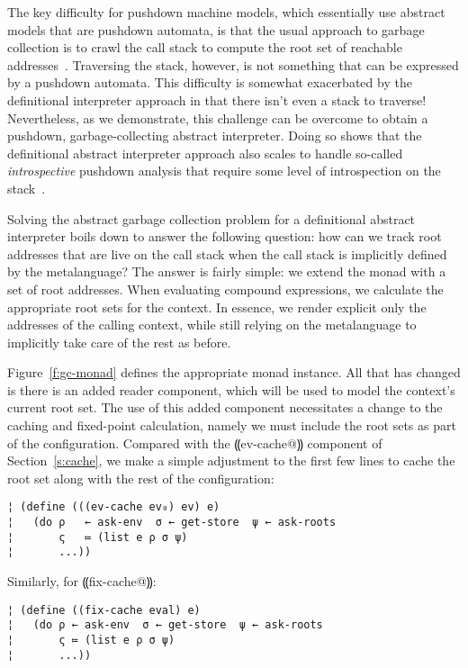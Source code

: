 The key difficulty for pushdown machine models, which essentially use
abstract models that are pushdown automata, is that the usual approach
to garbage collection is to crawl the call stack to compute the root
set of reachable addresses~\cite{dvanhorn:Morrisett1995Abstract}.
Traversing the stack, however, is not something that can be expressed
by a pushdown automata.
%
This difficulty is somewhat exacerbated by the definitional
interpreter approach in that there isn't even a stack to traverse!
Nevertheless, as we demonstrate, this challenge can be overcome to
obtain a pushdown, garbage-collecting abstract interpreter.
%
Doing so shows that the definitional abstract interpreter approach
also scales to handle so-called \emph{introspective} pushdown analysis
that require some level of introspection on the
stack~\cite{dvanhorn:Earl2012Introspective,dvanhorn:Johnson2014Pushdown}.

Solving the abstract garbage collection problem for a definitional
abstract interpreter boils down to answer the following question: how
can we track root addresses that are live on the call stack when the
call stack is implicitly defined by the metalanguage?  The answer is
fairly simple: we extend the monad with a set of root addresses.  When
evaluating compound expressions, we calculate the appropriate root
sets for the context.  In essence, we render explicit only the
addresses of the calling context, while still relying on the
metalanguage to implicitly take care of the rest as before.

Figure~\ref{f:gc-monad} defines the appropriate monad instance.  All
that has changed is there is an added reader component, which will be
used to model the context's current root set.
%
The use of this added component necessitates a change to the caching
and fixed-point calculation, namely we must include the root sets as part
of the configuration.  Compared with the ⸨ev-cache@⸩ component of
Section~\ref{s:cache}, we make a simple adjustment to the first few
lines to cache the root set along with the rest of the configuration:
\begin{lstlisting}
¦ (define (((ev-cache ev₀) ev) e)
¦   (do ρ   ← ask-env  σ ← get-store  ψ ← ask-roots
¦       ς   ≔ (list e ρ σ ψ)
¦       ...))
\end{lstlisting}
Similarly, for ⸨fix-cache@⸩:
\begin{lstlisting}
¦ (define ((fix-cache eval) e)  
¦   (do ρ ← ask-env  σ ← get-store  ψ ← ask-roots
¦       ς ≔ (list e ρ σ ψ)
¦       ...))
\end{lstlisting}

